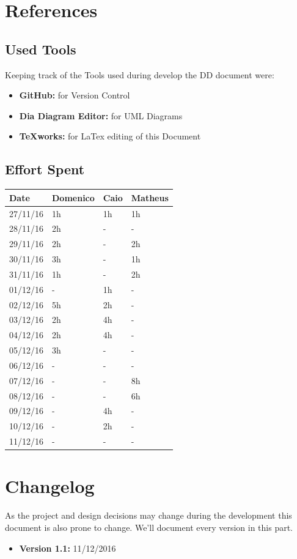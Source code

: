 \documentclass[a4paper]{article}
\begin{document}
\newpage

\section{References}
\subsection{Used Tools}
Keeping track of the Tools used during develop the DD document were:
\begin{itemize}
	\item \textbf{GitHub:} for Version Control
	\item \textbf {Dia Diagram Editor:} for UML Diagrams
	\item \textbf {TeXworks:} for LaTex editing of this Document
\end{itemize}
\newpage
\subsection{Effort Spent}
\begin{tabular}{ | l | l | l | l | }
\hline
	\textbf {Date} & \textbf {Domenico} & \textbf {Caio} & \textbf {Matheus} \\ \hline
	27/11/16& 1h & 1h & 1h  \\ \hline
	28/11/16& 2h & - & - \\ \hline
	29/11/16& 2h & - & 2h\\ \hline
	30/11/16& 3h & - & 1h\\ \hline
	31/11/16& 1h & - & 2h\\ \hline
	01/12/16& - & 1h & - \\ \hline
	02/12/16& 5h & 2h & - \\ \hline
	03/12/16& 2h & 4h & - \\ \hline
	04/12/16& 2h & 4h & - \\ \hline
	05/12/16& 3h & - & - \\ \hline
	06/12/16& - & - & - \\ \hline
	07/12/16& - & - & 8h\\ \hline
	08/12/16& - & - & 6h\\ \hline
	09/12/16& - & 4h & - \\ \hline
	10/12/16& - & 2h & - \\ \hline
	11/12/16& - & - & - \\ \hline
\end{tabular}
\newpage

\section{Changelog}
As the project and design decisions may change during the development this document is also prone to change.
We'll document every version in this part.
\begin{itemize}
\item \textbf {Version 1.1:} 11/12/2016
\end{itemize}
\end{document}
